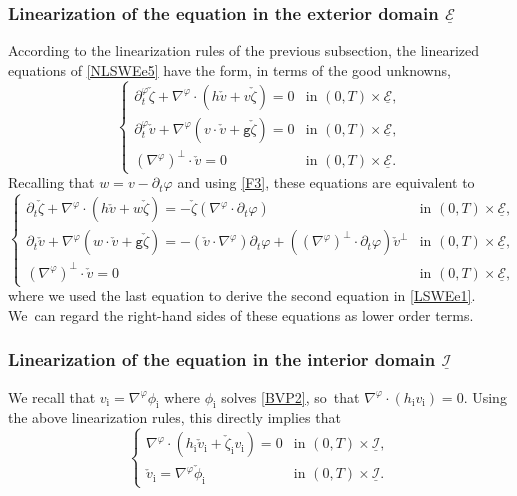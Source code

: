 \documentclass[10pt]{amsart}
\newcommand{\gr}{{\mathtt g}}
\newcommand{\dt}{\partial_t}
\newcommand{\cI}{{\mathcal I}}
\newcommand{\cE}{{\mathcal E}}
\newcommand{\ul}[1]{\underline{#1}}
\theoremstyle{definition}
\begin{document}
\subsubsection{Linearization of the equation in the exterior domain $\ul{\cE}$}
According to the linearization rules of the previous subsection, the linearized equations of \eqref{NLSWEe5} have the form, in terms of the good unknowns,
\[\begin{cases}
\dt^\varphi\check{\zeta}+\nabla^\varphi\cdot(h\check{v}+v\check{\zeta}) = 0 &\text{in } (0,T)\times\ul{\cE}, \\
\dt^\varphi\check{v}+\nabla^\varphi(v\cdot\check{v}+\gr\check{\zeta}) = 0 &\text{in } (0,T)\times\ul{\cE}, \\
(\nabla^\varphi)^\perp\cdot\check{v} = 0 &\text{in } (0,T)\times\ul{\cE}.
\end{cases}
\]
Recalling that $w=v-\dt\varphi$ and using \eqref{F3}, these equations are equivalent to
\begin{equation}\label{LSWEe1}
\begin{cases}
\dt\check{\zeta}+\nabla^\varphi\cdot(h\check{v}+w\check{\zeta}) = -\check{\zeta}(\nabla^\varphi\cdot\dt\varphi) &\text{in } (0,T)\times\ul{\cE}, \\
\dt\check{v}+\nabla^\varphi(w\cdot\check{v}+\gr\check{\zeta}) = -(\check{v}\cdot\nabla^\varphi)\dt\varphi+((\nabla^\varphi)^\perp\cdot\dt\varphi)\check{v}^\perp
&\text{in } (0,T)\times\ul{\cE}, \\
(\nabla^\varphi)^\perp\cdot\check{v} = 0 &\text{in } (0,T)\times\ul{\cE},
\end{cases}
\end{equation}
where we used the last equation to derive the second equation in \eqref{LSWEe1}. We~can regard the right-hand sides of these equations as lower order terms.

\subsubsection{Linearization of the equation in the interior domain $\ul{\cI}$}
We recall that $v_\mathrm{i}=\nabla^\varphi\phi_\mathrm{i}$ where $\phi_\mathrm{i}$ solves \eqref{BVP2}, so~that $\nabla^\varphi\cdot(h_\mathrm{i}v_\mathrm{i})=0$.
Using the above linearization rules, this directly implies that
\begin{equation}\label{LSWEi1}
\begin{cases}
\nabla^\varphi\cdot(h_\mathrm{i}\check{v}_\mathrm{i}+\check{\zeta}_\mathrm{i} v_\mathrm{i}) = 0 &\text{in } (0,T)\times\ul{\cI}, \\
\check{v}_\mathrm{i}=\nabla^\varphi\check{\phi}_\mathrm{i} &\text{in } (0,T)\times\ul{\cI}.
\end{cases}
\end{equation}
\end{document}
